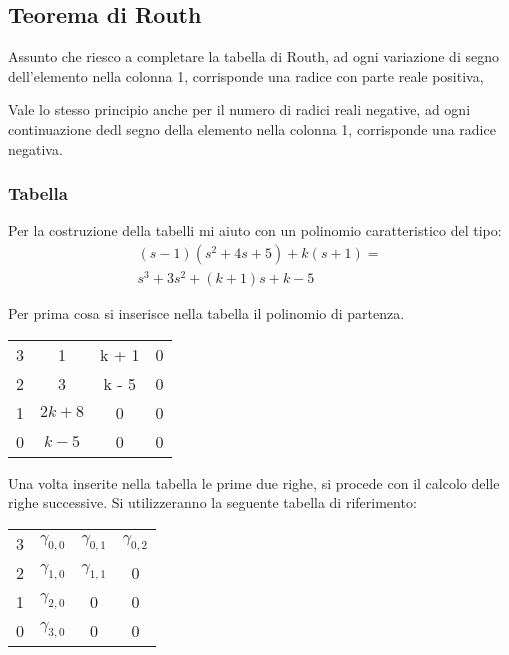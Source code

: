 \documentclass{article}
\begin{document}
  \subsection{Teorema di Routh}
  Assunto che riesco a completare la tabella di Routh, ad ogni variazione di segno dell'elemento nella colonna 1, corrisponde
  una radice con parte reale positiva,
  
  Vale lo stesso principio anche per il numero di radici reali negative, ad ogni continuazione dedl segno della elemento nella colonna 1,
  corrisponde una radice negativa.



  \subsubsection{Tabella}
  Per la costruzione della tabelli mi aiuto con un polinomio caratteristico del tipo:
  \begin{align}
    (s-1)(s^2+4s+5) + k(s+1)  = \\
    s^3 + 3s^2 + (k + 1)s + k - 5
  \end{align}

  Per prima cosa si inserisce nella tabella il polinomio di partenza.

  \begin{center}
    \begin{tabular}{| c | c  c  c |}
      \hline
      3 & 1 & k + 1 & 0 \\
      2 & 3 & k - 5 & 0 \\
      1 & $2k + 8$ & 0 & 0 \\
      0 & $k - 5$ & 0 & 0 \\
      \hline
    \end{tabular}
  \end{center}

  Una volta inserite nella tabella le prime due righe, si procede con il calcolo delle righe successive.
  Si utilizzeranno la seguente tabella di riferimento:

  \begin{center}
    \begin{tabular}{| c | c  c  c |}
      \hline
      3 & $\gamma_{0, 0}$ & $\gamma_{0, 1}$ & $\gamma_{0, 2}$ \\
      2 & $\gamma_{1, 0}$ & $\gamma_{1, 1}$ & 0 \\
      1 & $\gamma_{2, 0}$ & 0 & 0 \\
      0 & $\gamma_{3, 0}$ & 0 & 0 \\
      \hline
    \end{tabular}
  \end{center}
\end{document}
